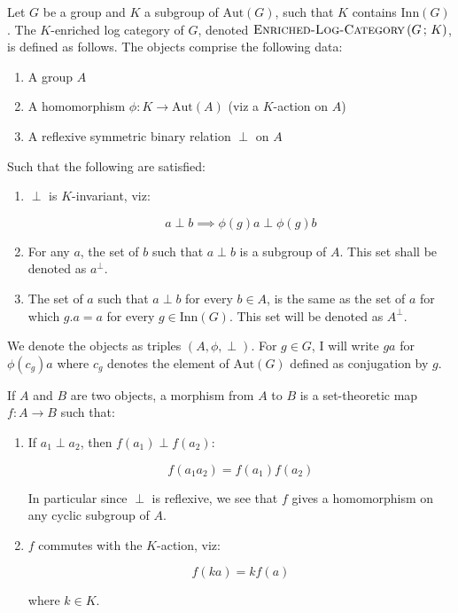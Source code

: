 \documentclass[a4paper]{amsart}
\newcommand{\enrichedlogcategory}[2]{\textsc{Enriched-Log-Category}\left(#1 \, ; \, #2\right)}
\newcommand{\aut}[1]{\text{Aut}\left(#1\right)}
\newcommand{\inn}[1]{\text{Inn}\left(#1\right)}
\begin{document}
\begin{definer}
  Let $G$ be a group and $K$ a subgroup of $\aut{G}$, such that $K$
  contains $\inn{G}$. The $K$-enriched log category of $G$, denoted
  $\enrichedlogcategory{G}{K}$, is defined as follows. The objects
  comprise the following data:

  \begin{enumerate}

  \item A group $A$

  \item A homomorphism $\phi: K \to \aut{A}$ (viz a $K$-action on $A$)

  \item A reflexive symmetric binary relation $\perp$ on $A$

  \end{enumerate}

  Such that the following are satisfied:

  \begin{enumerate}

  \item $\perp$ is $K$-invariant, viz:

    $$a \perp b \implies \phi(g)a \perp \phi(g)b$$
  \item For any $a$, the set of $b$ such that $a \perp b$ is a
    subgroup of $A$. This set shall be denoted as $a^\perp$.

  \item The set of $a$ such that $a \perp b$ for every $b \in A$, is
    the same as the set of $a$ for which $g.a = a$ for every $g
    \in \inn{G}$. This set will be denoted as $A^\perp$.

  \end{enumerate}

  We denote the objects as triples $(A,\phi,\perp)$. For $g \in G$, I
  will write $ga$ for $\phi(c_g)a$ where $c_g$ denotes the element of
  $\aut{G}$ defined as conjugation by $g$.

  If $A$ and $B$ are two objects, a morphism from $A$ to $B$ is a
  set-theoretic map $f: A \to B$ such that:

  \begin{enumerate}

  \item If $a_1 \perp a_2$, then $f(a_1) \perp f(a_2)$:

    $$f(a_1a_2) = f(a_1)f(a_2)$$

    In particular since $\perp$ is reflexive, we see that $f$ gives a
    homomorphism on any cyclic subgroup of $A$.

  \item $f$ commutes with the $K$-action, viz:

    $$f(ka) = kf(a)$$

    where $k \in K$.
  \end{enumerate}
\end{definer}
\end{document}
